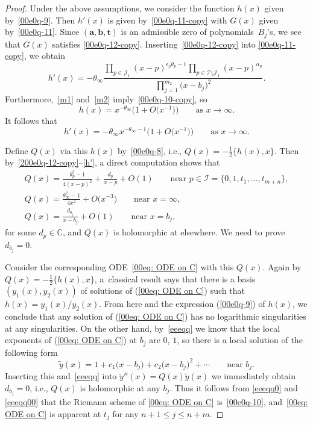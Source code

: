 \documentclass[pdftex]{sigma}
\numberwithin{equation}{section}
\begin{document}
\begin{proof} Under the above assumptions, we consider the function $h(x)$ given by~\eqref{00e0q-9}. Then $h'(x)$ is given by~\eqref{00e0q-11-copy} with $G(x)$ given by~\eqref{00e0q-11}.
Since $(\boldsymbol a,\boldsymbol b,\boldsymbol t)$ is an admissible
zero of polynomials~$B_j$'s, we see that $G(x)$ satisfies
\eqref{00e0q-12-copy}. Inserting~\eqref{00e0q-12-copy} into
\eqref{00e0q-11-copy}, we obtain
\begin{equation}\label{200e0q-12-copy}h'(x)=-\theta_\infty \frac{ \prod_{p\in \mathcal{J}_1}(x-p)^{\epsilon_{p}\theta_{p}-1}\prod_{p\in \mathcal{I}\setminus\mathcal{J}_1}(x-p)^{{\alpha}_{p}}}{\prod_{j=1}^{m_2}\bigl(x-b_j\bigr)^2}.\end{equation}
Furthermore,~\eqref{m1} and~\eqref{m2} imply~\eqref{00e0q-10-copy}, so
\begin{equation}\label{h}
 h(x)=x^{-\theta_\infty}\bigl(1+O\bigl(x^{-1}\bigr)\bigr)\qquad \text{as }x\to\infty.
\end{equation}
It follows that
\begin{equation}\label{h'}h'(x)=-\theta_\infty x^{-\theta_\infty-1}\bigl(1+O\bigl(x^{-1}\bigr)\bigr)\qquad \text{as }x\to\infty.\end{equation}

Define $Q(x)$ via this $h(x)$ by~\eqref{00e0q-8}, i.e., $Q(x)=-\frac12\{h(x),x\}$.
Then by~\eqref{200e0q-12-copy}--\eqref{h'}, a direct computation shows
that
\begin{gather}
\label{eeeqq0}Q(x)=\frac{\theta_p^2-1}{4(x-p)^2}+\frac{d_p}{x-p}+O(1)\qquad \text{near }p\in \mathcal{I}=\{0,1,t_1,\dots,t_{m+n}\},\\
\label{eeeqq00}Q(x)=\frac{\theta_\infty^2-1}{4x^2}+O\bigl(x^{-3}\bigr)\qquad \text{near }x=\infty,\\
\label{eeeqq}Q(x)=\frac{d_{b_j}}{x-b_j}+O(1)\qquad \text{near }x=b_j,
\end{gather}
for some $d_p\in\mathbb{C}$, and $Q(x)$ is holomorphic at elsewhere. We need to prove $d_{b_j}=0$.

Consider the corresponding ODE~\eqref{00eq: ODE on C} with this $Q(x)$. Again by $Q(x)=-\frac12\{h(x),x\}$, a~classical result says that there is a basis $(y_1(x),y_2(x))$ of solutions of (\ref{00eq: ODE on C}) such that $h(x)=y_1(x)/y_2(x)$. From here and the expression (\ref{00e0q-9}) of $h(x)$, we conclude that any solution of (\ref{00eq: ODE on C}) has no logarithmic singularities at any singularities.
On the other hand, by~\eqref{eeeqq} we know that the local exponents of (\ref{00eq: ODE on C}) at $b_j$ are $0$, $1$, so there is a local solution of the following form
\[\tilde{y}(x)=1+c_1\bigl(x-b_j\bigr)+c_2\bigl(x-b_j\bigr)^2+\cdots \qquad\text{near }b_j.\]
Inserting this and~\eqref{eeeqq} into
$\tilde{y}''(x)=Q(x)\tilde{y}(x)$ we immediately obtain $d_{b_j}=0$,
i.e., $Q(x)$ is holomorphic at any $b_j$. Thus it follows from
\eqref{eeeqq0} and \eqref{eeeqq00} that the Riemann scheme of
\eqref{00eq: ODE on C} is~\eqref{00e0q-10}, and~\eqref{00eq: ODE on C}
is apparent at $t_j$ for any $n+1\leq j\leq n+m$.


\end{proof}
\end{document}
